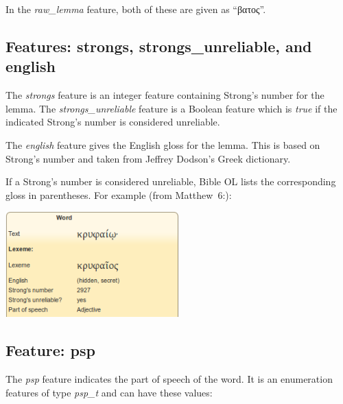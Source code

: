 \documentclass[11pt,oneside,a4paper]{memoir}
\newcommand*{\bibleref}[3]{#1~#2\thinspace:\thinspace#3}
\begin{document}
In the \emph{raw\_lemma} feature, both of these are given as ``βατος''.

\subsection{Features: strongs, strongs\_unreliable, and english}

The \emph{strongs} feature is an integer feature containing Strong's number for the lemma. The
\emph{strongs\_unreliable} feature is a Boolean feature which is \emph{true} if the indicated
Strong's number is considered unreliable.

The \emph{english} feature gives the English gloss for the lemma. This is based on Strong's number
and taken from Jeffrey Dodson's Greek dictionary.

If a Strong's number is considered unreliable, Bible OL lists the corresponding gloss in
parentheses. For example (from \bibleref{Matthew}{6}{18}):

\begin{center}
  \includegraphics[width=0.5\textwidth]{unreliable.png}
\end{center}

\subsection{Feature: psp}

The \emph{psp} feature indicates the part of speech of the word. It is an enumeration features of
type \emph{psp\_t} and can have these values:
\end{document}
